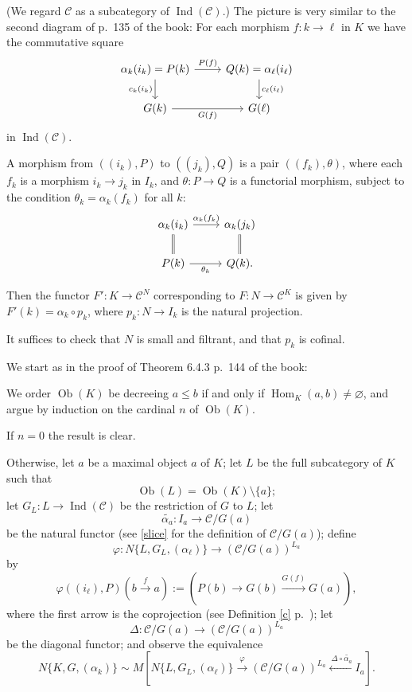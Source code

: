 \documentclass[12pt]{article}
\theoremstyle{remark}
\theoremstyle{definition}
\newcommand{\n}{\noindent}
\newcommand{\C}{\mathcal C}
\newcommand{\p}{\varphi}
\newcommand{\xr}{\xrightarrow}
\DeclareMathOperator{\h}{Hom}
\DeclareMathOperator{\Ind}{Ind}
\DeclareMathOperator{\Ob}{Ob}
\begin{document}
\n(We regard $\C$ as a subcategory of $\Ind(\C)$.) The picture is very similar to the second diagram of p.~135 of the book: For each morphism $f:k\to\ell$ in $K$ we have the commutative square  
$$ 
\begin{tikzcd} 
\alpha_k(i_k)=P(k)\ar{r}{P(f)}\ar{d}[swap]{c_k(i_k)}&Q(k)=\alpha_\ell(i_\ell)\ar{d}{c_\ell(i_\ell)}\\ 
G(k)\ar{r}[swap]{G(f)}&G(\ell) 
\end{tikzcd} 
$$ 
in $\Ind(\C)$. 

A morphism from $((i_k),P)$ to $((j_k),Q)$ is a pair $((f_k),\theta)$, where each $f_k$ is a morphism $i_k\to j_k$ in $I_k$, and $\theta:P\to Q$ is a functorial morphism, subject to the condition $\theta_k=\alpha_k(f_k)$ for all $k$: 
$$ 
\begin{tikzcd} 
\alpha_k(i_k)\ar{r}{\alpha_k(f_k)}\ar[equal]{d}&\alpha_k(j_k)\ar[equal]{d}\\ 
P(k)\ar{r}[swap]{\theta_k}&Q(k).
\end{tikzcd} 
$$ 

Then the functor $F':K\to\C^N$ corresponding to $F:N\to\C^K$ is given by $F'(k)=\alpha_k\circ p_k$, where $p_k:N\to I_k$ is the natural projection. 

It suffices to check that $N$ is small and filtrant, and that $p_k$ is cofinal. 

We start as in the proof of Theorem 6.4.3 p.~144 of the book: 

We order $\Ob(K)$ be decreeing $a\le b$ if and only if $\h_K(a,b)\neq\varnothing$, and argue by induction on the cardinal $n$ of $\Ob(K)$. 

If $n=0$ the result is clear. 

Otherwise, let $a$ be a maximal object $a$ of $K$; let $L$ be the full subcategory of $K$ such that 
$$
\Ob(L)=\Ob(K)\setminus\{a\};
$$ 
let $G_L:L\to\Ind(\C)$ be the restriction of $G$ to $L$; let 
$$
\widetilde{\alpha_a}:I_a\to\C/G(a)
$$ 
be the natural functor (see \eqref{slice} for the definition of $\C/G(a)$); define  
$$ 
\p:N\{L,G_L,(\alpha_\ell)\}\to(\C/G(a))^{L_a} 
$$ 
by 
$$
\p((i_\ell),P)\left(b\xr f a\right):=\left(P(b)\to G(b)\xr{G(f)}G(a)\right),
$$
where the first arrow is the coprojection (see Definition \ref{c} p.~\pageref{c}); let 
$$
\Delta:\C/G(a)\to(\C/G(a))^{L_a}
$$ 
be the diagonal functor; and observe the equivalence 
$$ 
N\{K,G,(\alpha_k)\}\sim M\left[N\{L,G_L,(\alpha_\ell)\}\xrightarrow{\p}(\C/G(a))^{L_a}\xleftarrow{\ \Delta\circ\widetilde{\alpha_a}}I_a\right]. 
$$ 
\end{document}
